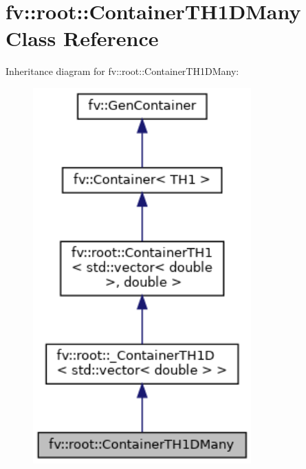 \hypertarget{classfv_1_1root_1_1ContainerTH1DMany}{}\section{fv\+:\+:root\+:\+:Container\+T\+H1\+D\+Many Class Reference}
\label{classfv_1_1root_1_1ContainerTH1DMany}


Inheritance diagram for fv\+:\+:root\+:\+:Container\+T\+H1\+D\+Many\+:
\nopagebreak
\begin{figure}[H]
\begin{center}
\leavevmode
\includegraphics[width=238pt]{classfv_1_1root_1_1ContainerTH1DMany__inherit__graph}
\end{center}
\end{figure}


